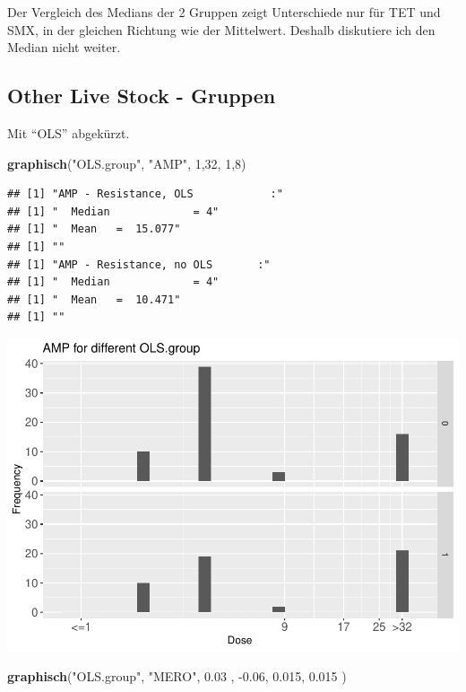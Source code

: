 \documentclass[
]{article}
\newenvironment{Shaded}{\begin{snugshade}}{\end{snugshade}}
\newcommand{\DecValTok}[1]{\textcolor[rgb]{0.00,0.00,0.81}{#1}}
\newcommand{\FloatTok}[1]{\textcolor[rgb]{0.00,0.00,0.81}{#1}}
\newcommand{\KeywordTok}[1]{\textcolor[rgb]{0.13,0.29,0.53}{\textbf{#1}}}
\newcommand{\NormalTok}[1]{#1}
\newcommand{\StringTok}[1]{\textcolor[rgb]{0.31,0.60,0.02}{#1}}
\begin{document}
Der Vergleich des Medians der 2 Gruppen zeigt Unterschiede nur für TET
und SMX, in der gleichen Richtung wie der Mittelwert. Deshalb diskutiere
ich den Median nicht weiter.

\hypertarget{other-live-stock---gruppen}{%
\subsection{Other Live Stock -
Gruppen}\label{other-live-stock---gruppen}}

Mit ``OLS'' abgekürzt.

\begin{Shaded}
\begin{Highlighting}[]
  \KeywordTok{graphisch}\NormalTok{(}\StringTok{"OLS.group"}\NormalTok{, }\StringTok{"AMP"}\NormalTok{, }\DecValTok{1}\NormalTok{,}\DecValTok{32}\NormalTok{, }\DecValTok{1}\NormalTok{,}\DecValTok{8}\NormalTok{)}
\end{Highlighting}
\end{Shaded}

\begin{verbatim}
## [1] "AMP - Resistance, OLS            :"
## [1] "  Median             = 4"
## [1] "  Mean   =  15.077"
## [1] ""
## [1] "AMP - Resistance, no OLS       :"
## [1] "  Median             = 4"
## [1] "  Mean   =  10.471"
## [1] ""
\end{verbatim}

\includegraphics{Verteilungen_files/figure-latex/unnamed-chunk-18-1.pdf}

\begin{Shaded}
\begin{Highlighting}[]
  \KeywordTok{graphisch}\NormalTok{(}\StringTok{"OLS.group"}\NormalTok{, }\StringTok{"MERO"}\NormalTok{, }\FloatTok{0.03}\NormalTok{ ,  }\FloatTok{-0.06}\NormalTok{,   }\FloatTok{0.015}\NormalTok{,   }\FloatTok{0.015}\NormalTok{ )}
\end{Highlighting}
\end{Shaded}
\end{document}

